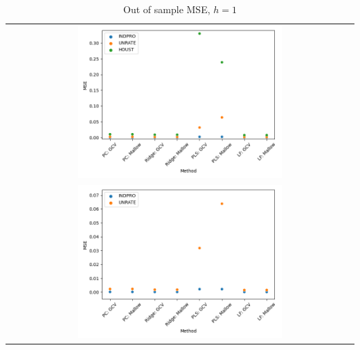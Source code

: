 \begin{table}[]
    \centering
    \begin{tabular}{c}
        \includegraphics[width=0.6\textwidth]{figures/MSE_oos_h1.png} \\
        \includegraphics[width=0.6\textwidth]{figures/MSE_oos_h1_noHOUST.png}
    \end{tabular}
    \caption*{Out of sample MSE, $h = 1$}
\end{table}

